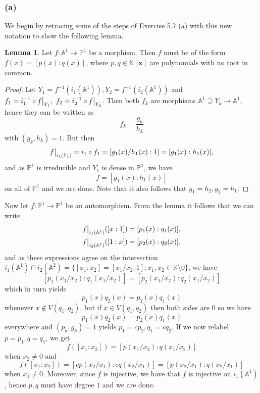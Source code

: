 \documentclass{article}
\newcommand\restr[2]{{%
  \left.\kern-\nulldelimiterspace %
  #1 %
  \vphantom{\big|} %
  \right|_{#2} %
  }}
\theoremstyle{definition}
\newtheorem{lemma}[theorem]{Lemma}
\newcommand{\K}{\mathbb{K}}
\renewcommand{\P}{\mathbb{P}}
\newcommand{\A}{\mathbb{A}}
\newcommand{\Kx}{\K[\bm{x}]}
\renewcommand{\AA}[1]{\A^{#1}}
\newcommand{\PP}[1]{\P^{#1}}
\begin{document}
\subsubsection*{(a)} 

We begin by retracing some of the steps of Exercise 5.7 (a)
with this new notation to show the following lemma.

\begin{lemma}
	Let $f : \AA{1} \to \PP{1}$ be a morphism. Then $f$ must be of the form $f(x) =
	[p(x):q(x)]$, where $p, q \in \Kx$ are polynomials with no root in common. 
\end{lemma}
\begin{proof}
	Let $Y_1 = f^{-1}(i_1(\AA{1})), Y_2 = f^{-1}(i_2(\AA{1}))$ and $f_1 =
	i_1^{-1} \circ \restr{f}{Y_1},\ f_2 = i_2^{-1} \circ \restr{f}{Y_2}$. Then
	both $f_k$ are morphisms $\AA{1} \supseteq Y_k \to \AA{1}$, hence they can
	be written as 
	\[
		f_k = \frac{g_k}{h_k}
	\] 
	with $(g_k, h_k) = 1$. But then 
	\[
		\restr{f}{i_1(Y_1)} = i_1 \circ f_1 = [g_1(x)/h_1(x):1] = [g_1(x):h_1(x)],
	\] 
	and as $\PP{1}$ is irreducible and $Y_1$ is dense in $\PP{1}$, we have
	\[
		f = [g_1(x):h_1(x)]
	\] 
	on all of $\PP{1}$ and we are done. Note that it also follows that $g_1 =
	h_2, g_2 = h_1$.
\end{proof}

Now let $f : \PP{1} \to \PP{1}$ be an automorphism. From the lemma it follows
that we can write
\begin{align*}
	\restr{f}{i_1(\AA{1})}([x:1]) &= [p_1(x) : q_1(x)], \\
	\restr{f}{i_2(\AA{1})}([1:x]) &= [p_2(x) : q_2(x)],
\end{align*}
and as these expressions agree on the intersection $i_1(\AA{1}) \cap i_2(\AA{2})
= \{[x_1 : x_2] = [x_1/x_2 : 1] : x_1,x_2 \in \K \setminus 0 \}$, we have 
\[
	[p_1(x_1/x_2) : q_1(x_1/x_2)] = [p_2(x_1/x_2) : q_2(x_1/x_2)]
\] 
which in turn yields 
\[
	p_1(x)q_2(x) = p_2(x)q_1(x)
\] 
whenever $x \not \in V(q_1, q_2)$, but if $x \in V(q_1, q_2)$ then both sides are $0$
so we have 
\[
	p_1(x)q_2(x) = p_2(x)q_1(x)
\] 
everywhere and $(p_k, g_k) = 1$ yields $p_1 = c p_2, q_1 = c q_2$. If
we now relabel $p = p_1, q = q_1$, we get
\[
	f([x_1 : x_2]) = [p(x_1/x_2) : q(x_1/x_2)]
\] 
when $x_2 \not = 0$ and 
\[
	f([x_1 : x_2]) = [c p(x_2/x_1) : c q(x_2/x_1)] = [p(x_2/x_1) : q(x_2/x_1)]
\] 
when $x_1 \not = 0$. Moreover, since $f$ is injective, we have that $f$ is
injective on $i_1(\AA{1})$, hence $p, q$ must have degree $1$ and we are done.
\end{document}
